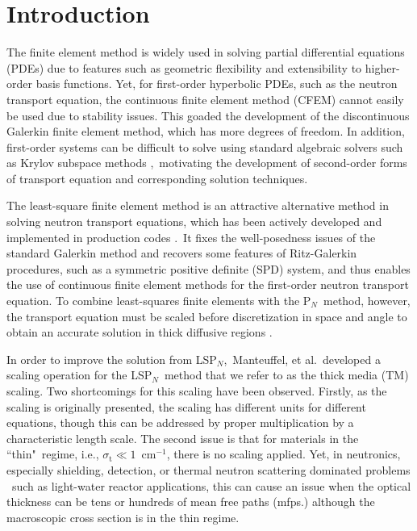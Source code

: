 \documentclass[review]{elsarticle}
\newcommand{\st}{\sigma_\mathrm{t}}
\newcommand{\pn}{P$_N$}
\newcommand{\siga}{\sigma_\mathrm{a}}
\newcommand{\icm}{cm$^{-1}$}
\begin{document}
\linenumbers

\section{Introduction}
\label{sect::intro}
The finite element method is widely used in solving partial differential equations (PDEs) due to features such as geometric flexibility and extensibility to higher-order basis functions. Yet, for first-order hyperbolic PDEs, such as the neutron transport equation, the continuous finite element method (CFEM) cannot easily be used due to stability issues. This goaded the development of the discontinuous Galerkin finite element method, which has  more degrees of freedom. In addition,  first-order systems can be difficult to solve using standard algebraic solvers {such as Krylov subspace methods} \cite{morel_saaf},\ motivating the development of second-order forms of transport equation and corresponding solution techniques.

The least-square finite element method is an attractive alternative method in solving neutron transport equations, which has been actively developed \cite{zheng-dissertation,zheng-l1,zheng_l1pn,zheng_l1sn,morel-holo,vincent-physor16,zheng-physor16} and implemented in production codes \cite{zheng-inl,yaqi-invite,clifmc}.\ It fixes the well-posedness issues of the standard Galerkin method and recovers some features of Ritz-Galerkin procedures, such as a symmetric positive definite (SPD) system, and thus enables the use of continuous finite element methods for the first-order neutron transport equation. To combine least-squares finite elements with the \pn\ method, however, the transport equation must be scaled before discretization in space and angle to obtain an accurate solution in thick diffusive regions \cite{manteuffel_lspn_scaling,manteuffel_boundary}. %

In order to improve the solution from LS\pn,\ Manteuffel, et al.\cite{manteuffel_lspn_scaling,manteuffel_boundary}\ developed a scaling operation for the LS\pn\ method that we refer to as the thick media (TM) scaling. Two shortcomings for this scaling have been observed. 
Firstly, as the scaling is originally presented, the scaling has different units for different equations, though this can be addressed by proper multiplication by a characteristic length scale. 
The second issue is that for materials in the ``thin"\ regime, i.e., $\st \ll 1$\ \icm, there is no scaling applied. Yet, in neutronics, especially shielding, detection, or thermal neutron scattering dominated problems \cite{zheng-freegas,zheng-emulation,Macf,thesis,physor,IKE,weixiong}\ such as light-water reactor applications, this can cause an issue when the optical thickness can be tens or hundreds of mean free paths (mfps.) although the macroscopic cross section is in the thin regime.
\end{document}
